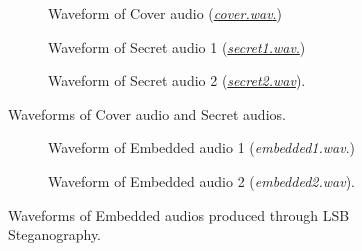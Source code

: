 \documentclass{article}
\begin{document}
\begin{figure}[!h]
    \begin{center}
        \begin{subfigure}[!h]{0.45\textwidth}
            
            \caption{Waveform of Cover audio (\href{https://pixabay.com/music/beats-no-place-to-go-216744/}{\textit{cover.wav}.})}
            \label{fig:coverAudio}
        \end{subfigure}
    \end{center}
    \begin{subfigure}[!h]{0.45\textwidth}
        \begin{center}
            \centering
            
            \caption{Waveform of Secret audio 1 (\href{https://pixabay.com/music/future-bass-alone-296348/}{\textit{secret1.wav}.})}
            \label{fig:secretAudio1}
        \end{center}
    \end{subfigure}
    \hfill
    \begin{subfigure}[!h]{0.45\textwidth}
        \begin{center}
            
            \caption{Waveform of Secret audio 2 (\href{https://pixabay.com/music/future-bass-stylish-deep-electronic-262632/}{\textit{secret2.wav}}).}
            \label{fig:secretAudio2}
        \end{center}
    \end{subfigure}
    \caption{Waveforms of Cover audio and Secret audios.}
\end{figure}
\begin{figure}[!h]
    \begin{subfigure}[!h]{0.45\textwidth}
        \begin{center}
            \centering
            
            \caption{Waveform of Embedded audio 1 (\textit{embedded1.wav}.)}
            \label{fig:embeddedAudio1}
        \end{center}
    \end{subfigure}
    \hfill
    \begin{subfigure}[!h]{0.45\textwidth}
        \begin{center}
            
            \caption{Waveform of Embedded audio 2 (\textit{embedded2.wav}).}
            \label{fig:embeddedAudio2}
        \end{center}
    \end{subfigure}
    \caption{Waveforms of Embedded audios produced through LSB Steganography.}
\end{figure}
\end{document}
